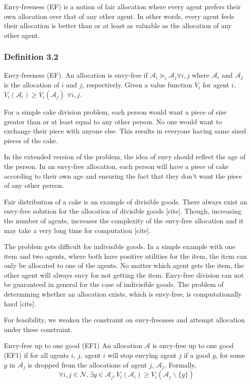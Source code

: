 Envy-freeness (EF) is a notion of fair allocation where every agent prefers their own allocation over that of any other agent. In other words, every agent feels their allocation is better than or at least as valuable as the allocation of any other agent.

\subsubsection{Definition 3.2} Envy-freeness (EF).
An allocation is envy-free if $\mathcal{A}_i \succeq_i \mathcal{A}_j \forall i,j$ where $\mathcal{A}_i$ and $\mathcal{A}_j$ is the allocation of $i$ and $j$, respectively. Given a value function $V_i$ for agent $i$, $V_i(\mathcal{A}_i) \geq V_i(\mathcal{A}_j)$ $\forall i,j$. 

For a simple cake division problem, each person would want a piece of size greater than or at least equal to any other person. No one would want to exchange their piece with anyone else. This results in everyone having same sized pieces of the cake.

In the extended version of the problem, the idea of envy should reflect the age of the person. In an envy-free allocation, each person will have a piece of cake according to their own age and ensuring the fact that they don't want the piece of any other person. 

Fair distribution of a cake is an example of divisible goods. There always exist an envy-free solution for the allocation of divisible goods [cite]. Though, increasing the number of agents, increases the complexity of the envy-free allocation and it may take a very long time for computation [cite].

The problem gets difficult for indivisible goods. In a simple example with one item and two agents, where both have positive utilities for the item, the item can only be allocated to one of the agents. No matter which agent gets the item, the other agent will always envy for not getting the item. Envy-free division can not be guaranteed in general for the case of indivisible goods. The problem of determining whether an allocation exists, which is envy-free, is computationally hard [cite].

For feasibility, we weaken the constraint on envy-freeness and attempt allocation under these constraint.

\begin{definition}{Envy-free up to one good (EF1) \cite{caragiannis2016unreasonable}}
\label{def_ef1}
An allocation $\mathcal{A}$ is envy-free up to one good (EF1) if for all agents $i$, $j$, agent $i$ will stop envying agent $j$ if a good $g$, for some $g$ in $\mathcal{A}_j$ is dropped from the allocations of agent $j$, $\mathcal{A}_j$. Formally,
$$
    \forall i,j \in \mathcal{N}, \exists g \in \mathcal{A}_j, V_i(\mathcal{A}_i) \geq V_i(\mathcal{A}_j \backslash \{g\})
$$
\end{definition}

